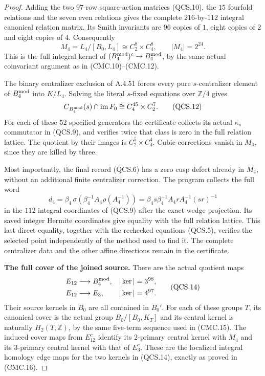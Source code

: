 \begin{proof}
Adding the two $97$-row square-action matrices (QCS.10), the $15$
fourfold relations and the seven even relations gives the complete
$216$-by-$112$ integral canonical relation matrix.  Its Smith invariants
are $96$ copies of $1$, eight copies of $2$ and eight copies of $4$.
Consequently
\[
 M_4=L_4/[B_0,L_4]\cong C_2^8\times C_4^8,
                 \qquad |M_4|=2^{24}.
 \tag{QCS.11}
\]
This is the full integral kernel of
$(B_4^{\rm mod})^c\to B_4^{\rm mod}$, by the same actual coinvariant
argument as in (CMC.10)--(CMC.12).

The binary centralizer exclusion of A.4.51 forces every pure
$s$-centralizer element of $B_4^{\rm mod}$ into $K/L_4$.
Solving the literal $s$-fixed equations over $\mathbb Z/4$ gives
\[
 C_{B_4^{\rm mod}}(s)\cap\operatorname{im}F_0
       \cong C_4^{45}\times C_2^7.
 \tag{QCS.12}
\]
For each of these $52$ specified generators the certificate collects
its actual $\kappa_s$ commutator in (QCS.9), and verifies twice that
class is zero in the full relation lattice.  The quotient by their
images is $C_2^5\times C_4^4$.  Cubic corrections vanish in $M_4$,
since they are killed by three.

Most importantly, the final record (QCS.6) has a zero cusp defect
already in $M_4$, without an additional finite centralizer correction.
The program  collects the full word
\[
 d_4=\beta_4\,\sigma\!\left(\beta_4^{-1}A_4\rho(A_4^{-1})\right)
     =\beta_4s\beta_4^{-1}A_4rA_4^{-1}(sr)^{-1}
 \tag{QCS.13}
\]
in the $112$ integral coordinates of (QCS.9) after the exact wedge
projection.  Its saved integer Hermite coordinates give equality with
the full relation lattice.  This last direct equality, together with
the rechecked equations (QCS.5), verifies the selected point independently
of the method used to find it.  The complete centralizer data and the
other affine directions remain in the certificate.

\par\medskip\noindent\textbf{The full cover of the joined source.}
There are the actual quotient maps
\[
 \begin{aligned}
 E_{12}&\longrightarrow B_4^{\rm mod},&|\ker|&=3^{98},\\
 E_{12}&\longrightarrow E_3,&|\ker|&=4^{97}.
 \end{aligned}
 \tag{QCS.14}
\]
Their source kernels in $B_0$ are all contained in $B_0'$.
For each of these groups $T$, its canonical cover is the actual group
$B_0/[B_0,K_T]$ and its central kernel is naturally $H_2(T,\mathbb Z)$,
by the same five-term sequence used in (CMC.15).  The induced cover
maps from $E_{12}^c$ identify its $2$-primary central kernel with $M_4$
and its $3$-primary central kernel with that of $E_3^c$.  These are the
localized integral homology edge maps for the two kernels in
(QCS.14), exactly as proved in (CMC.16).


\end{proof}
